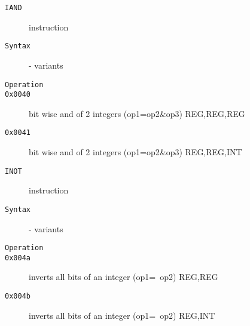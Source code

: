 \begin{description}
\item[\texttt{IAND}] instruction\\
\item[\texttt{Syntax}] - variants\\

\item[\texttt{Operation}]
\item[\texttt{}]
\item[\texttt{0x0040}] bit wise and of 2 integers (op1=op2\&op3)  {REG,REG,REG}       \\
\item[\texttt{0x0041}] bit wise and of 2 integers (op1=op2\&op3)  {REG,REG,INT}       \\
\end{description}
\clearpage
\begin{description}
\item[\texttt{INOT}] instruction\\
\item[\texttt{Syntax}] - variants\\

\item[\texttt{Operation}]
\item[\texttt{}]
\item[\texttt{0x004a}] inverts all bits of an integer (op1=~op2)  {REG,REG}           \\
\item[\texttt{0x004b}] inverts all bits of an integer (op1=~op2)  {REG,INT}           \\
\end{description}
\clearpage
